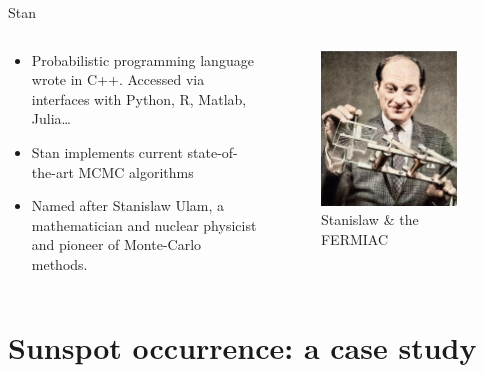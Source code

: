 \documentclass[aspectratio=169]{beamer}
\begin{document}
\begin{frame}{Stan}
  \begin{columns}
    \begin{column}{0.6\textwidth}
      \begin{itemize}
        \item Probabilistic programming language wrote in C++. Accessed via
              interfaces with Python, R, Matlab, Julia\ldots
        \item Stan implements current state-of-the-art MCMC algorithms
        \item Named after Stanislaw Ulam, a mathematician and nuclear physicist and
              pioneer of Monte-Carlo methods.
      \end{itemize}
    \end{column}
    \begin{column}{0.4\textwidth}
      \begin{figure}
        \includegraphics[width=0.9\textwidth]{stan.jpg}
        \caption{Stanislaw \& the FERMIAC}
      \end{figure}
    \end{column}
  \end{columns}
\end{frame}

\section{Sunspot occurrence: a case study}
\end{document}
